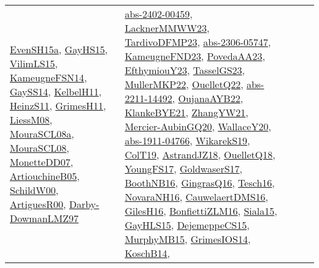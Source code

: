 {\begin{longtable}{lp{3cm}>{\raggedright}p{6cm}>{\raggedright}p{6cm}p{8cm}}
\href{articles/EvenSH15a.pdf}{EvenSH15a}\cite{EvenSH15a}, \href{papers/GayHS15.pdf}{GayHS15}\cite{GayHS15}, \href{papers/VilimLS15.pdf}{VilimLS15}\cite{VilimLS15}, \href{articles/KameugneFSN14.pdf}{KameugneFSN14}\cite{KameugneFSN14}, \href{papers/GaySS14.pdf}{GaySS14}\cite{GaySS14}, \href{articles/KelbelH11.pdf}{KelbelH11}\cite{KelbelH11}, \href{papers/HeinzS11.pdf}{HeinzS11}\cite{HeinzS11}, \href{papers/GrimesH11.pdf}{GrimesH11}\cite{GrimesH11}, \href{articles/LiessM08.pdf}{LiessM08}\cite{LiessM08}, \href{papers/MouraSCL08a.pdf}{MouraSCL08a}\cite{MouraSCL08a}, \href{papers/MouraSCL08.pdf}{MouraSCL08}\cite{MouraSCL08}, \href{papers/MonetteDD07.pdf}{MonetteDD07}\cite{MonetteDD07}, \href{papers/ArtiouchineB05.pdf}{ArtiouchineB05}\cite{ArtiouchineB05}, \href{articles/SchildW00.pdf}{SchildW00}\cite{SchildW00}, \href{articles/ArtiguesR00.pdf}{ArtiguesR00}\cite{ArtiguesR00}, \href{articles/Darby-DowmanLMZ97.pdf}{Darby-DowmanLMZ97}\cite{Darby-DowmanLMZ97} & \href{articles/abs-2402-00459.pdf}{abs-2402-00459}\cite{abs-2402-00459}, \href{articles/LacknerMMWW23.pdf}{LacknerMMWW23}\cite{LacknerMMWW23}, \href{papers/TardivoDFMP23.pdf}{TardivoDFMP23}\cite{TardivoDFMP23}, \href{articles/abs-2306-05747.pdf}{abs-2306-05747}\cite{abs-2306-05747}, \href{papers/KameugneFND23.pdf}{KameugneFND23}\cite{KameugneFND23}, \href{papers/PovedaAA23.pdf}{PovedaAA23}\cite{PovedaAA23}, \href{papers/EfthymiouY23.pdf}{EfthymiouY23}\cite{EfthymiouY23}, \href{papers/TasselGS23.pdf}{TasselGS23}\cite{TasselGS23}, \href{articles/MullerMKP22.pdf}{MullerMKP22}\cite{MullerMKP22}, \href{papers/OuelletQ22.pdf}{OuelletQ22}\cite{OuelletQ22}, \href{articles/abs-2211-14492.pdf}{abs-2211-14492}\cite{abs-2211-14492}, \href{papers/OujanaAYB22.pdf}{OujanaAYB22}\cite{OujanaAYB22}, \href{papers/KlankeBYE21.pdf}{KlankeBYE21}\cite{KlankeBYE21}, \href{articles/ZhangYW21.pdf}{ZhangYW21}\cite{ZhangYW21}, \href{papers/Mercier-AubinGQ20.pdf}{Mercier-AubinGQ20}\cite{Mercier-AubinGQ20}, \href{articles/WallaceY20.pdf}{WallaceY20}\cite{WallaceY20}, \href{articles/abs-1911-04766.pdf}{abs-1911-04766}\cite{abs-1911-04766}, \href{articles/WikarekS19.pdf}{WikarekS19}\cite{WikarekS19}, \href{papers/ColT19.pdf}{ColT19}\cite{ColT19}, \href{papers/AstrandJZ18.pdf}{AstrandJZ18}\cite{AstrandJZ18}, \href{papers/OuelletQ18.pdf}{OuelletQ18}\cite{OuelletQ18}, \href{papers/YoungFS17.pdf}{YoungFS17}\cite{YoungFS17}, \href{papers/GoldwaserS17.pdf}{GoldwaserS17}\cite{GoldwaserS17}, \href{papers/BoothNB16.pdf}{BoothNB16}\cite{BoothNB16}, \href{papers/GingrasQ16.pdf}{GingrasQ16}\cite{GingrasQ16}, \href{papers/Tesch16.pdf}{Tesch16}\cite{Tesch16}, \href{articles/NovaraNH16.pdf}{NovaraNH16}\cite{NovaraNH16}, \href{papers/CauwelaertDMS16.pdf}{CauwelaertDMS16}\cite{CauwelaertDMS16}, \href{papers/GilesH16.pdf}{GilesH16}\cite{GilesH16}, \href{papers/BonfiettiZLM16.pdf}{BonfiettiZLM16}\cite{BonfiettiZLM16}, \href{articles/Siala15.pdf}{Siala15}\cite{Siala15}, \href{papers/GayHLS15.pdf}{GayHLS15}\cite{GayHLS15}, \href{papers/DejemeppeCS15.pdf}{DejemeppeCS15}\cite{DejemeppeCS15}, \href{papers/MurphyMB15.pdf}{MurphyMB15}\cite{MurphyMB15}, \href{articles/GrimesIOS14.pdf}{GrimesIOS14}\cite{GrimesIOS14}, \href{papers/KoschB14.pdf}{KoschB14}\cite{KoschB14}, 
\end{longtable}}
